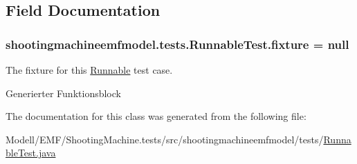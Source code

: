 \subsection{Field Documentation}
\hypertarget{classshootingmachineemfmodel_1_1tests_1_1_runnable_test_a98d9a54395c948b2684a42eed1c01a4b}{
\subsubsection[{fixture}]{ shootingmachineemfmodel.\-tests.\-Runnable\-Test.\-fixture = null\hspace{0.3cm}{\ttfamily [protected]}}}\label{classshootingmachineemfmodel_1_1tests_1_1_runnable_test_a98d9a54395c948b2684a42eed1c01a4b}
The fixture for this \hyperlink{interfaceshootingmachineemfmodel_1_1_runnable}{Runnable} test case.

Generierter Funktionsblock 

The documentation for this class was generated from the following file\-:\begin{DoxyCompactItemize}
\item 
Modell/\-E\-M\-F/\-Shooting\-Machine.\-tests/src/shootingmachineemfmodel/tests/\hyperlink{_runnable_test_8java}{Runnable\-Test.\-java}\end{DoxyCompactItemize}
